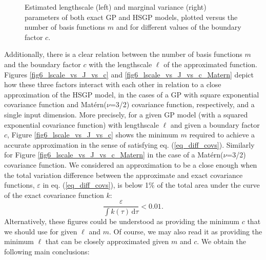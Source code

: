 \documentclass[onecolumn,a4paper,11pt]{article}
\begin{document}
\begin{figure}
\caption{Estimated lengthscale (left) and marginal variance (right) parameters of both exact GP and HSGP models, plotted versus the number of basis functions $m$ and for different values of the boundary factor $c$.}
  \label{fig5_lscale_vs_J}
\end{figure}


Additionally, there is a clear relation between the number of basis functions $m$ and the boundary factor $c$ with the lengthscale $\ell$ of the approximated function. Figures \ref{fig6_lscale_vs_J_vs_c} and \ref{fig6_lscale_vs_J_vs_c_Matern} depict how these three factors interact with each other in relation to a close approximation of the HSGP model, in the cases of a GP with square exponential covariance function and Mat\'ern($\nu$=3/2) covariance function, respectively, and a single input dimension. More precisely, for a given GP model (with a squared exponential covariance function) with lengthscale $\ell$ and given a boundary factor $c$, Figure \ref{fig6_lscale_vs_J_vs_c} shows the minimum $m$ required to achieve a accurate approximation in the sense of satisfying eq. (\ref{eq_diff_covs}). Similarly for Figure \ref{fig6_lscale_vs_J_vs_c_Matern} in the case of a Mat\'ern($\nu$=3/2) covariance function. We considered an approximation to be a close enough when the total variation difference between the approximate and exact covariance functions, $\varepsilon$ in eq. (\ref{eq_diff_covs}), is below 1$\%$ of the total area under the curve of the exact covariance function $k$:
%
\begin{equation*}
 \frac{\varepsilon}{\int k(\tau) \,\mathrm{d}\tau} < 0.01.
\end{equation*}
%
Alternatively, these figures could be understood as providing the minimum $c$ that we should use for given $\ell$ and $m$. Of course, we may also read it as providing the minimum $\ell$ that can be closely approximated given $m$ and $c$. We obtain the following main conclusions:
\end{document}
